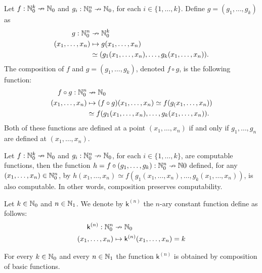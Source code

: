\begin{definition}
	Let $f : \mathbb{N}_0^k \nrightarrow \mathbb{N}_0$ and $g_i : \mathbb{N}_0^n \nrightarrow \mathbb{N}_0$, for each $i \in \{ 1, \ldots, k \}$. Define $g = (g_1, \ldots, g_k)$ as  
	\begin{align*}
	g : \mathbb{N}_0^n  & \nrightarrow  \mathbb{N}_0^k \\
	(x_1, \ldots, x_n)  & \mapsto  g(x_1, \ldots, x_n) \\ 
	& \simeq (g_1(x_1, \ldots, x_n), \ldots, g_k(x_1, \ldots, x_n)).
	\end{align*}
	The composition of $f$ and $g = (g_1, \ldots, g_k)$, denoted $f \circ g$, is the following function:
	\begin{align*}
		f \circ g : \mathbb{N}_0^n & \nrightarrow \mathbb{N}_0 \\
		(x_1, \ldots, x_n) & \mapsto (f \circ g)(x_1, \ldots, x_n) \simeq f(g_(x_1, \ldots, x_n)) \\
				   & \simeq f(g_1(x_1, \ldots, x_n), \ldots, g_k(x_1, \ldots, x_n)).
	\end{align*}
Both of these functions are defined at a point $(x_1, \ldots, x_n)$ if and only if $g_1, \ldots, g_n$ are defined at $(x_1, \ldots, x_n)$.
\end{definition}

\begin{theorem}
	Let $f:\mathbb{N}_0^k \nrightarrow \mathbb{N}_0$ and $g_i : \mathbb{N}_0^n \nrightarrow \mathbb{N}_0$, for each $i \in \{ 1, \ldots, k \}$, are computable functions, then the function $h = f \circ ( g_1, \ldots, g_k) : \mathbb{N}_0^n \nrightarrow \mathbb{N}0$ defined, for any $(x_1, \ldots, x_n) \in \mathbb{N}_0^n$, by $h(x_1, \ldots, x_n) \simeq f(g_1(x_1, \ldots, x_n), \ldots, g_k(x_1, \ldots, x_n))$, is also computable. In other words, composition preserves computability.
\end{theorem}

\begin{definition}
	Let $k \in \mathbb{N}_0$ and $n \in \mathbb{N}_1$. We denote by $\mathsf{k}^{(n)}$ the $n$-ary constant function define as follows:
	\begin{align*}
		\mathsf{k}^{(n)} : \mathbb{N}_0^n & \nrightarrow \mathbb{N}_0 \\
		(x_1, \ldots, x_n) & \mapsto \mathsf{k}^{(n)}(x_1, \ldots, x_n) = k
	\end{align*}
\end{definition}

\begin{theorem}
	For every $k \in \mathbb{N}_0$ and every $n \in \mathbb{N}_1$ the function $\mathsf{k}^{(n)}$ is obtained by composition of basic functions.
\end{theorem}

